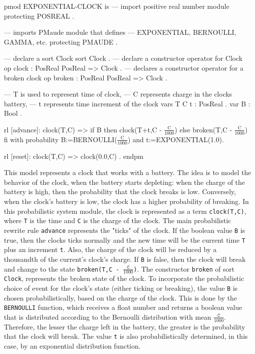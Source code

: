 \begin{maude}[mathescape=true]
pmod EXPONENTIAL-CLOCK is
  --- import positive real number module
  protecting POSREAL .

  --- imports PMaude module that defines
  --- EXPONENTIAL, BERNOULLI, GAMMA, etc.
  protecting PMAUDE .

  --- declare a sort Clock
  sort Clock .
  --- declare a constructor operator for Clock
  op clock : PosReal PosReal => Clock .
  --- declares a constructor operator for a broken clock
  op broken : PosReal PosReal => Clock .

  --- T is used to represent time of clock,
  --- C represents charge in the clocks battery,
  --- t represents time increment of the clock
  vars T C t : PosReal . var B : Bool .
  
  rl [advance]: clock(T,C) =>
                      if B then
                           clock(T+t,C - $\frac{\text{C}}{1000}$)
                      else
                           broken(T,C - $\frac{\text{C}}{1000}$)
                      fi
                with probability B:=BERNOULLI($\frac{\text{C}}{1000}$) 
                                and 
                                t:=EXPONENTIAL(1.0).
                
  rl [reset]: clock(T,C) => clock(0.0,C) .
endpm
\end{maude}
This model represents a clock that works with a battery. The idea is to model the behavior of the clock, when the battery starts depleting: when the charge of the battery is high, then the probability that the clock breaks is low. Conversely, when the clock's battery is low, the clock has a higher probability of breaking. In this probabilistic system module, the clock is represented as a term \texttt{clock(T,C)}, where \texttt{T} is the time and \texttt{C} is the charge of the clock. The main probabilistic rewrite rule \texttt{advance} represents the "ticks" of the clock. If the boolean value \texttt{B} is true, then the clocks ticks normally and the new time will be the current time \texttt{T} plus an increment \texttt{t}. Also, the charge of the clock will be reduced by a thousandth of the current's clock's charge. If \texttt{B} is false, then the clock will break and change to the state \texttt{broken(T,C - $\frac{\texttt{C}}{1000}$)}. The constructor \texttt{broken} of sort \texttt{Clock}, represents the broken state of the clock. To incorporate the probabilistic choice of event for the clock's state (either ticking or breaking), the value \texttt{B} is chosen probabilistically, based on the charge of the clock. This is done by the \texttt{BERNOULLI} function, which receives a float number and returns a boolean value that is distributed according to the Bernoulli distribution with mean $\frac{\texttt{C}}{1000}$. Therefore, the lesser the charge left in the battery, the greater is the probability that the clock will break. The value \texttt{t} is also probabilistically determined, in this case, by an exponential distribution function.
